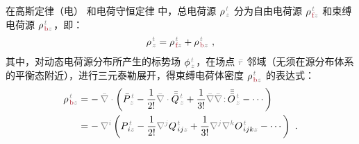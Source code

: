 在高斯定律（电）  和电荷守恒定律  中，总电荷源 ${\rho}^{\;\!\mathcolor{gray}{t}}_{\;\!\mathcolor{gray}{z}}$ 分为自由电荷源 ${\rho}^{\;\!\mathcolor{gray}{t}}_{\;\!\textcolor{Maroon}{\text{f}}\mathcolor{gray}{z}}$ 和束缚电荷源 ${\rho}^{\;\!\mathcolor{gray}{t}}_{\;\!\textcolor{Maroon}{\text{b}}\mathcolor{gray}{z}}$\cite{langeMultipoleTheoryHehl2015,raabMultipoleTheoryElectromagnetism2004}，即：
\begin{align} \label{eq:p=f+b}
	{\rho}^{\;\!\mathcolor{gray}{t}}_{\;\!\mathcolor{gray}{z}} = {\rho}^{\;\!\mathcolor{gray}{t}}_{\;\!\textcolor{Maroon}{\text{f}}\mathcolor{gray}{z}} + {\rho}^{\;\!\mathcolor{gray}{t}}_{\;\!\textcolor{Maroon}{\text{b}}\mathcolor{gray}{z}}~,
\end{align}
其中，对动态电荷源分布所产生的标势场 $\phi^{\;\!\mathcolor{gray}{t}}_{\;\!\mathcolor{gray}{z}}$，在场点 $\mathcolor{gray}{\bar{r}}$ 邻域（无须在源分布体系的平衡态附近），进行三元泰勒展开，得束缚电荷体密度 ${\rho}^{\;\!\mathcolor{gray}{t}}_{\;\!\textcolor{Maroon}{\text{b}}\mathcolor{gray}{z}}$ 的表达式\cite{raabMultipoleTheoryElectromagnetism2004,delangeTranslationalInvariancePost2012,chen-zhuChenZhuxieUndergraduate_courses2024}：
\begin{subequations}
\begin{align}
	{\rho}^{\;\!\mathcolor{gray}{t}}_{\;\!\textcolor{Maroon}{\text{b}}\mathcolor{gray}{z}} &= -\hspace{0.2em} \mathcolor{gray}{\bar{\nabla} \cdot} \left( \bar{P}^{\;\!\mathcolor{gray}{t}}_{\;\!\mathcolor{gray}{z}} - \frac{1}{2!} \mathcolor{gray}{\bar{\nabla} \cdot} \bar{\bar{Q}}^{\;\!\mathcolor{gray}{t}}_{\;\!\mathcolor{gray}{z}} + \frac{1}{3!} \mathcolor{gray}{\bar{\nabla}} \mathcolor{gray}{\bar{\nabla} \colon}\! \bar{\bar{\bar{O}}}^{\;\!\mathcolor{gray}{t}}_{\;\!\mathcolor{gray}{z}} - \cdots \right) \label{eq:P-b} \\
	&= -\hspace{0.2em} \mathcolor{gray}{\nabla^i} \left( P^{\;\!\mathcolor{gray}{t}}_{\;\! i\mathcolor{gray}{z}} - \frac{1}{2!} \mathcolor{gray}{\nabla^j} Q^{\;\!\mathcolor{gray}{t}}_{\;\! ij\mathcolor{gray}{z}} + \frac{1}{3!} \mathcolor{gray}{\nabla^j} \mathcolor{gray}{\nabla^k} O^{\;\!\mathcolor{gray}{t}}_{\;\! ijk\mathcolor{gray}{z}} - \cdots \right)~. \label{eq:p-b}
\end{align}
\end{subequations}

